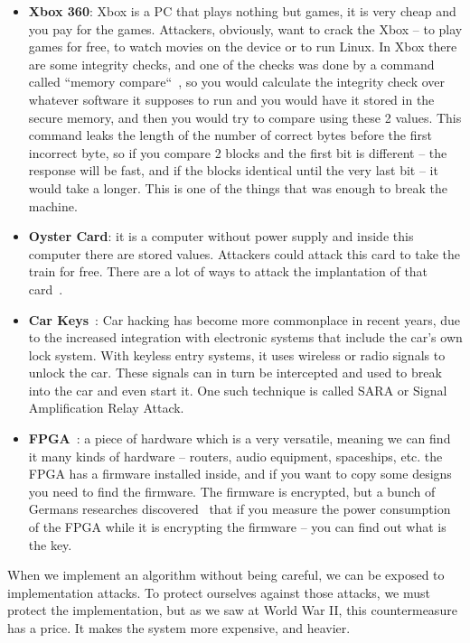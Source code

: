 \begin{itemize}
    \item \textbf{Xbox 360}: Xbox is a PC that plays nothing but games, it is
    very cheap and you pay for the games. Attackers, obviously, want to crack
    the Xbox – to play games for free, to watch movies on the device or to run
    Linux. In Xbox there are some integrity checks, and one of the checks was
    done by a command called ``memory compare``~\cite{memcmp}, so you would
    calculate the integrity check over whatever software it supposes to run and
    you would have it stored in the secure memory, and then you would try to
    compare using these 2 values. This command leaks the length of the number of
    correct bytes before the first incorrect byte, so if you compare 2 blocks
    and the first bit is different – the response will be fast, and if the
    blocks identical until the very last bit – it would take a longer. This is
    one of the things that was enough to break the machine. 
    \item \textbf{Oyster Card}: it is a computer without power supply and inside
    this computer there are stored values. Attackers could attack this card to
    take the train for free. There are a lot of ways to attack the implantation
    of that card~\cite{garcia2008dismantling, courtois2008algebraic}.
    \item \textbf{Car Keys}~: Car hacking has become more commonplace in recent years, due to the increased integration with electronic systems that include the car’s own lock system.
    With keyless entry systems, it uses wireless or radio signals to unlock the car.
    These signals can in turn be intercepted and used to break into the car and even start it.
    One such technique is called SARA or Signal Amplification Relay Attack. \cite{relayAttack}
    \item \textbf{FPGA}~\cite{fpga}: a piece of hardware which is a very
    versatile, meaning we can find it many kinds of hardware – routers, audio
    equipment, spaceships, etc. the FPGA has a firmware installed inside, and if
    you want to copy some designs you need to find the firmware. The firmware is
    encrypted, but a bunch of Germans researches
    discovered~\cite{moradi2011vulnerability} that if you measure the power
    consumption of the FPGA while it is encrypting the firmware – you can find
    out what is the key.
\end{itemize}

When we implement an algorithm without being careful, we can be exposed to
implementation attacks. To protect ourselves against those attacks, we must protect the implementation, but as we saw at World War II, this countermeasure has a price. It makes the system more expensive, and heavier.

